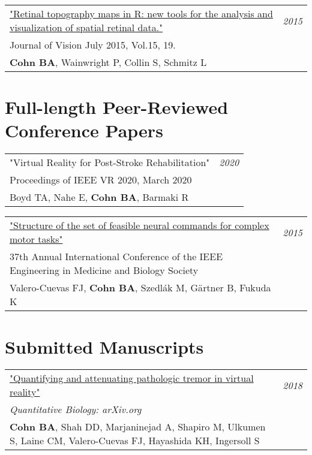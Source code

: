 \documentclass[10pt,a4paper]{article}
\begin{document}
\vspace*{1mm}\noindent\begin{tabularx}{17cm}{X r}
    \href{https://github.com/bc/resume/raw/master/papers/cohn_et_al_2015_jov.pdf}{"Retinal topography maps in R: new tools for the analysis and visualization of spatial retinal data."}  & \textit{2015}\\
    Journal of Vision July 2015, Vol.15, 19. \\
    \textbf{Cohn BA}, Wainwright P, Collin S, Schmitz L \\[2mm]
\end{tabularx}


\vspace*{3mm}\section*{Full-length Peer-Reviewed Conference Papers} 

\vspace*{1mm}\noindent\begin{tabularx}{17cm}{X r}
   "Virtual Reality for Post-Stroke Rehabilitation" & \textit{2020}\\
    Proceedings of IEEE VR 2020, March 2020 \\
    Boyd TA, Nahe E, \textbf{Cohn BA}, Barmaki R \\[2mm]
\end{tabularx}

\vspace*{1mm}\noindent\begin{tabularx}{17cm}{X r}
    \href{https://github.com/bc/resume/raw/master/papers/valero_cuevas_et_al_2015_ieee_embs.pdf}{"Structure of the set of feasible neural commands for complex motor tasks" } & \textit{2015}\\
    37th Annual International Conference of the IEEE Engineering in Medicine and Biology Society \\
    Valero-Cuevas FJ, \textbf{Cohn BA}, Szedl\'{a}k M, G{\"a}rtner B, Fukuda K \\[2mm]
\end{tabularx}


\vspace*{3mm}\section*{Submitted Manuscripts} 

\vspace*{1mm}\noindent\begin{tabularx}{17cm}{X r}
  \href{https://arxiv.org/pdf/1809.05970.pdf}{"Quantifying and attenuating pathologic tremor in virtual reality"} & \textit{2018} \\ %
  \textit{Quantitative Biology: arXiv.org} \\
  \textbf{Cohn BA}, Shah DD, Marjaninejad A, Shapiro M, Ulkumen S, Laine CM, Valero-Cuevas FJ, Hayashida KH, Ingersoll S \\[2mm]
\end{tabularx}
\end{document}
